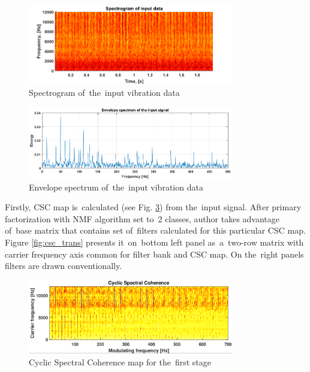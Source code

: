 \begin{figure}[ht!]
\centering
\includegraphics[width=0.8\textwidth]{wykresy/csc_raw_spec.png}
\caption{Spectrogram of~the~input vibration data}
\label{fig:csc_raw_spec}
\end{figure} 

\begin{figure}[ht!]
\centering
\includegraphics[width=0.8\textwidth]{wykresy/csc_raw_env.png}
\caption{Envelope spectrum of~the~input vibration data}
\label{fig:csc_raw_env}
\end{figure}

Firstly, CSC map is~calculated (see Fig. \ref{fig:csc}) from the~input signal. After primary factorization with NMF algorithm set to~2 classes, author takes advantage of~base matrix that contains set of~filters calculated for this particular CSC map. Figure \ref{fig:csc_trans} presents it~on~bottom left panel as~a~two-row matrix with carrier frequency axis common for filter bank and CSC map. On the~right panels filters are drawn conventionally. 

\begin{figure}[ht!]
\centering
\includegraphics[width=0.8\textwidth]{wykresy/csc}
\caption{Cyclic Spectral Coherence map for the~first stage}
\label{fig:csc}
\end{figure}



